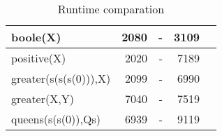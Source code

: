 \begin{table}[t]
\begin{tabular}{||l|r|r|r|r||}
boole(X)                     &  2080      &  -       &  3109   &          \\ 
\hline %
positive(X)                  &  2020      &  -       &  7189   &          \\ 
\hline %
greater(s(s(s(0))),X)        &  2099      &  -       &  6990   &          \\ 
\hline %
greater(X,Y)                 &  7040      &  -       &  7519   &          \\ 
\hline %
queens(s(s(0)),Qs)           &  6939      &  -       &  9119   &          \\ 

\hline %
\hline %

\end{tabular}
\vspace*{3mm}
\caption{Runtime comparation}
\label{table}
\end{table}
 
